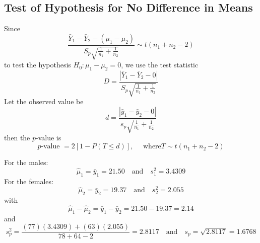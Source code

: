 \subsection{Test of Hypothesis for No Difference in Means}
Since
\[\frac{\bar{Y}_{1}-\bar{Y}_{2}-\left(\mu_{1}-\mu_{2}\right)}{S_{p} \sqrt{\frac{1}{n_{1}}+\frac{1}{n_{2}}}} \sim t\left(n_{1}+n_{2}-2\right)\]
to test the hypothesis $ H_0:\mu_1-\mu_2=0 $,
we use the test statistic
\[D=\frac{\left|\bar{Y}_{1}-\bar{Y}_{2}-0\right|}{S_{p} \sqrt{\frac{1}{n_{1}}+\frac{1}{n_{2}}}}\]
Let the observed value be
\[d=\frac{\left|\bar{y}_{1}-\bar{y}_{2}-0\right|}{s_{p} \sqrt{\frac{1}{n_{1}}+\frac{1}{n_{2}}}}\]
then the $ p $-value is
\[p \text{-value }=2[1-P(T \leq d)], \quad \text{ where} T \sim t\left(n_{1}+n_{2}-2\right)\]
\begin{exbox}
    \begin{example}
        For the males:
        \[\hat{\mu}_{1}=\bar{y}_{1}=21.50 \quad \text{and} \quad s_{1}^{2}=3.4309\]
        For the females:
        \[\hat{\mu}_{2}=\bar{y}_{2}=19.37 \quad \text{and} \quad s_{2}^{2}=2.055\]
        with
        \[\hat{\mu}_{1}-\hat{\mu}_{2}=\bar{y}_{1}-\bar{y}_{2}=21.50-19.37=2.14\]
        and
        \[s_{p}^{2}=\frac{(77)(3.4309)+(63)(2.055)}{78+64-2}=2.8117 \quad \text{and} \quad s_{p}=\sqrt{2.8117}=1.6768\]

    \end{example}
\end{exbox}
